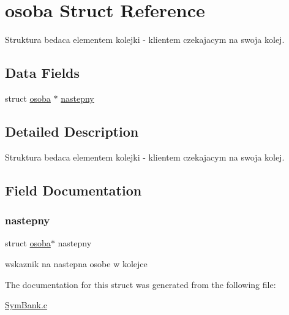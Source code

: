 \hypertarget{structosoba}{}\section{osoba Struct Reference}
\label{structosoba}


Struktura bedaca elementem kolejki -\/ klientem czekajacym na swoja kolej.  


\subsection*{Data Fields}
\begin{DoxyCompactItemize}
\item 
struct \hyperlink{structosoba}{osoba} $\ast$ \hyperlink{structosoba_a945ad8a5b4e7386be5803f176e414629}{nastepny}
\end{DoxyCompactItemize}


\subsection{Detailed Description}
Struktura bedaca elementem kolejki -\/ klientem czekajacym na swoja kolej. 

\subsection{Field Documentation}
\mbox{\label{structosoba_a945ad8a5b4e7386be5803f176e414629}} 
\subsubsection{\texorpdfstring{nastepny}{nastepny}}
{\footnotesize\ttfamily struct \hyperlink{structosoba}{osoba}$\ast$ nastepny}

wskaznik na nastepna osobe w kolejce 

The documentation for this struct was generated from the following file\+:\begin{DoxyCompactItemize}
\item 
\hyperlink{_sym_bank_8c}{Sym\+Bank.\+c}\end{DoxyCompactItemize}
